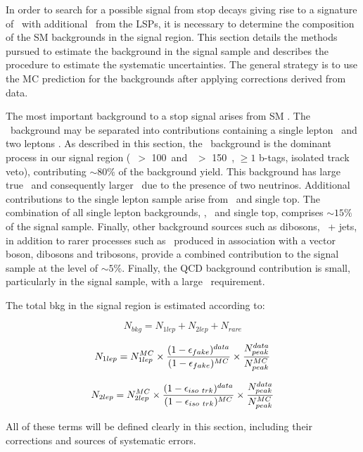 
In order to search for a possible signal from stop decays giving rise to a signature of \ttbar\ with additional \met\
from the LSPs, it is necessary to determine the composition of the SM backgrounds in the signal region. 
This section details the methods pursued to estimate the background in the signal sample and describes the 
procedure to estimate the systematic uncertainties. The general strategy is to use the MC prediction for the 
backgrounds after applying corrections derived from data. 

The most important background to a stop signal arises from SM \ttbar. The \ttbar\ background may be 
separated into contributions containing a single lepton \ttlj\ and two leptons \ttll. As described in this section, 
the \ttll\ background is the dominant process in our signal region (\met\ $>$ 100~\GeV and \mt\ $>$ 150~\GeV, $\ge 1$ b-tags, isolated track veto),
contributing $\sim 80\%$ of the background yield.
%
This background has large true \met\ and consequently larger \mt\ due to the presence of two neutrinos.
Additional contributions to the single lepton sample arise from \wjets\ and single top. The combination of 
all single lepton backgrounds, \ttlj, \wjets\ and single top, comprises $\sim 15\%$ of the signal sample. 
Finally, other background sources such as dibosons, \dy\ + jets, in addition to rarer processes such as \ttbar\ 
produced in association with a vector boson, dibosons and tribosons,
provide a combined contribution to the signal 
sample at the level of $\sim 5\%$.
Finally, the QCD background contribution is small, particularly in the signal sample, with a large \met\ requirement.

The total bkg in the signal region is estimated according to:

$$ N_{bkg}  = N_{1 lep} + N_{2 lep} + N_{rare} $$

$$ N_{1 lep} = N_{1 lep}^{MC} 
\times 
{(1- \epsilon_{fake})^{data} \over (1 - \epsilon_{fake})^{MC}} 
\times 
{N_{peak}^{data} \over N_{peak}^{MC}}
$$

$$ N_{2 lep} = N_{2 lep}^{MC} 
\times 
{(1- \epsilon_{iso\ trk})^{data} \over (1 - \epsilon_{iso\ trk})^{MC}} 
\times 
{N_{peak}^{data} \over N_{peak}^{MC}}
$$

All of these terms will be defined clearly in this section, including
their corrections and sources of systematic errors.


